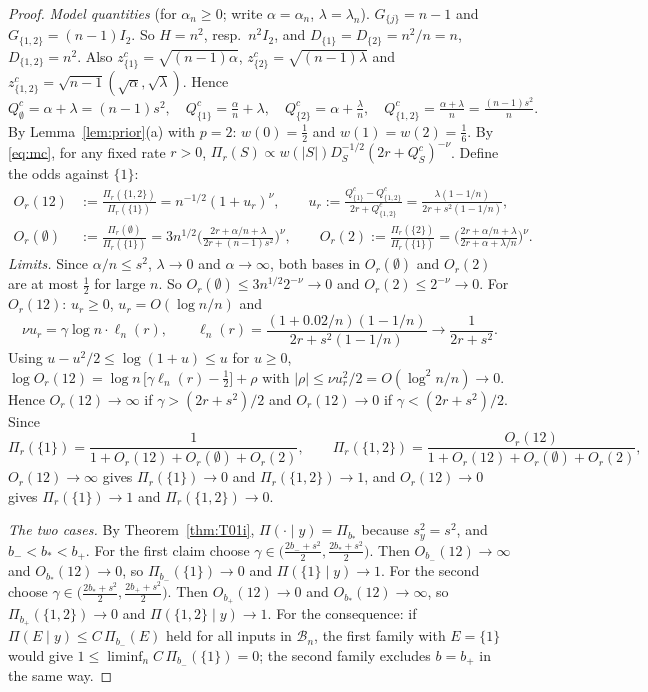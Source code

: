 \documentclass[11pt]{article}
\theoremstyle{remark}
\newcommand{\B}{\mathcal B}
\newcommand{\sy}{s_y}
\newcommand{\bm}{b_-}
\newcommand{\bp}{b_+}
\begin{document}
\begin{proof}
\emph{Model quantities} (for $\alpha_n\ge0$; write $\alpha=\alpha_n$, $\lambda=\lambda_n$). $G_{\{j\}}=n-1$ and $G_{\{1,2\}}=(n-1)I_2$. So $H=n^2$, resp.\ $n^2I_2$, and $D_{\{1\}}=D_{\{2\}}=n^2/n=n$, $D_{\{1,2\}}=n^2$. Also $z^c_{\{1\}}=\sqrt{(n-1)\alpha}$, $z^c_{\{2\}}=\sqrt{(n-1)\lambda}$ and $z^c_{\{1,2\}}=\sqrt{n-1}(\sqrt \alpha,\sqrt \lambda)$. Hence
\[
Q^c_\emptyset=\alpha+\lambda=(n-1)s^2,\quad Q^c_{\{1\}}=\tfrac{\alpha}{n}+\lambda,\quad Q^c_{\{2\}}=\alpha+\tfrac{\lambda}{n},\quad Q^c_{\{1,2\}}=\tfrac{\alpha+\lambda}{n}=\tfrac{(n-1)s^2}{n}.
\]
By Lemma~\ref{lem:prior}(a) with $p=2$: $w(0)=\frac12$ and $w(1)=w(2)=\frac16$. By \eqref{eq:mc}, for any fixed rate $r>0$, $\Pi_r(S)\propto w(|S|)D_S^{-1/2}(2r+Q^c_S)^{-\nu}$. Define the odds against $\{1\}$:
\begin{align*}
O_r(12)&:=\frac{\Pi_r(\{1,2\})}{\Pi_r(\{1\})}=n^{-1/2}(1+u_r)^\nu,\qquad u_r:=\frac{Q^c_{\{1\}}-Q^c_{\{1,2\}}}{2r+Q^c_{\{1,2\}}}=\frac{\lambda(1-1/n)}{2r+s^2(1-1/n)},\\
O_r(\emptyset)&:=\frac{\Pi_r(\emptyset)}{\Pi_r(\{1\})}=3n^{1/2}\Big(\frac{2r+\alpha/n+\lambda}{2r+(n-1)s^2}\Big)^\nu,\qquad
O_r(2):=\frac{\Pi_r(\{2\})}{\Pi_r(\{1\})}=\Big(\frac{2r+\alpha/n+\lambda}{2r+\alpha+\lambda/n}\Big)^\nu .
\end{align*}
\emph{Limits.} Since $\alpha/n\le s^2$, $\lambda\to0$ and $\alpha\to\infty$, both bases in $O_r(\emptyset)$ and $O_r(2)$ are at most $\frac12$ for large $n$. So $O_r(\emptyset)\le3n^{1/2}2^{-\nu}\to0$ and $O_r(2)\le2^{-\nu}\to0$. For $O_r(12)$: $u_r\ge0$, $u_r=O(\log n/n)$ and
\[
\nu u_r=\gamma\log n\cdot\ell_n(r),\qquad \ell_n(r)=\frac{(1+0.02/n)(1-1/n)}{2r+s^2(1-1/n)}\to\frac1{2r+s^2}.
\]
Using $u-u^2/2\le\log(1+u)\le u$ for $u\ge0$, $\log O_r(12)=\log n\,\big[\gamma\ell_n(r)-\tfrac12\big]+\rho$ with $|\rho|\le\nu u_r^2/2=O(\log^2n/n)\to0$. Hence $O_r(12)\to\infty$ if $\gamma>(2r+s^2)/2$ and $O_r(12)\to0$ if $\gamma<(2r+s^2)/2$. Since
\[
\Pi_r(\{1\})=\frac1{1+O_r(12)+O_r(\emptyset)+O_r(2)},\qquad\Pi_r(\{1,2\})=\frac{O_r(12)}{1+O_r(12)+O_r(\emptyset)+O_r(2)},
\]
$O_r(12)\to\infty$ gives $\Pi_r(\{1\})\to0$ and $\Pi_r(\{1,2\})\to1$, and $O_r(12)\to0$ gives $\Pi_r(\{1\})\to1$ and $\Pi_r(\{1,2\})\to0$.

\emph{The two cases.} By Theorem~\ref{thm:T01i}, $\Pi(\cdot\mid y)=\Pi_{b_*}$ because $\sy^2=s^2$, and $\bm<b_*<\bp$. For the first claim choose $\gamma\in\big(\frac{2\bm+s^2}2,\frac{2b_*+s^2}2\big)$. Then $O_{\bm}(12)\to\infty$ and $O_{b_*}(12)\to0$, so $\Pi_{\bm}(\{1\})\to0$ and $\Pi(\{1\}\mid y)\to1$. For the second choose $\gamma\in\big(\frac{2b_*+s^2}2,\frac{2\bp+s^2}2\big)$. Then $O_{\bp}(12)\to0$ and $O_{b_*}(12)\to\infty$, so $\Pi_{\bp}(\{1,2\})\to0$ and $\Pi(\{1,2\}\mid y)\to1$. For the consequence: if $\Pi(E\mid y)\le C\,\Pi_{\bm}(E)$ held for all inputs in $\B_n$, the first family with $E=\{1\}$ would give $1\le\liminf_n C\,\Pi_{\bm}(\{1\})=0$; the second family excludes $b=\bp$ in the same way.
\end{proof}
\end{document}
